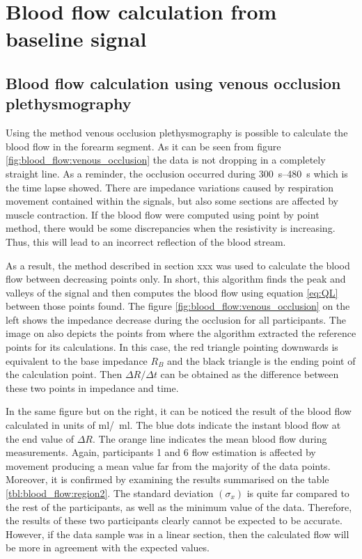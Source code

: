 \pagebreak
\section{Blood flow calculation from baseline signal}
\label{section5.4}

\subsection{Blood flow calculation using venous occlusion plethysmography}
\label{section5.4.1}
Using the method venous occlusion plethysmography is possible to calculate the blood flow in the forearm segment. As it can be seen from figure \ref{fig:blood_flow:venous_occlusion} the data is not dropping in a completely straight line. As a reminder, the occlusion occurred during \SIrange{300}{480}{\second} which is the time lapse showed. There are impedance variations caused by respiration movement contained within the signals, but also some sections are affected by muscle contraction. If the blood flow were computed using point by point method, there would be some discrepancies when the resistivity is increasing. Thus, this will lead to an incorrect reflection of the blood stream. 

As a result, the method described in section xxx was used to calculate the blood flow between decreasing points only. In short, this algorithm finds the peak and valleys of the signal and then computes the blood flow using equation \ref{eq:QL} between those points found. The figure \ref{fig:blood_flow:venous_occlusion} on the left shows the impedance decrease during the occlusion for all participants. The image on also depicts the points from where the algorithm extracted the reference points for its calculations. In this case, the red triangle pointing downwards is equivalent to the base impedance $R_B$ and the black triangle is the ending point of the calculation point. Then $\Delta R / \Delta t$ can be obtained as the difference between these two points in impedance and time. 

In the same figure but on the right, it can be noticed the result of the blood flow calculated in units of \si{\ml /  \ml}. The blue dots indicate the instant blood flow at the end value of $\Delta R$. The orange line indicates the mean blood flow during measurements. Again, participants 1 and 6 flow estimation is affected by movement producing a mean value far from the majority of the data points. Moreover, it is confirmed by examining the results summarised on the table \ref{tbl:blood_flow:region2}. The standard deviation $(\sigma_x)$ is quite far compared to the rest of the participants, as well as the minimum value of the data. Therefore, the results of these two participants clearly cannot be expected to be accurate. However, if the data sample was in a linear section, then the calculated flow will be more in agreement with the expected values. 

